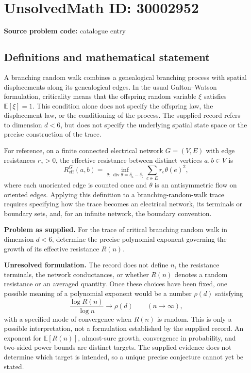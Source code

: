 \documentclass[11pt]{article}
\newcommand{\E}{\mathbb{E}}
\begin{document}
\section*{UnsolvedMath ID: 30002952}
\textbf{Source problem code:} catalogue entry
\subsection{Definitions and mathematical statement}
A branching random walk combines a genealogical branching process with spatial displacements along its genealogical edges. In the usual Galton--Watson formulation, criticality means that the offspring random variable \(\xi\) satisfies \(\E[\xi]=1\). This condition alone does not specify the offspring law, the displacement law, or the conditioning of the process. The supplied record refers to dimension \(d<6\), but does not specify the underlying spatial state space or the precise construction of the trace.

For reference, on a finite connected electrical network \(G=(V,E)\) with edge resistances \(r_e>0\), the effective resistance between distinct vertices \(a,b\in V\) is
\[
R_{\mathrm{eff}}^G(a,b)=\inf_{\theta:\,\operatorname{div}\theta=\delta_a-\delta_b}\sum_{e\in E}r_e\theta(e)^2,
\]
where each unoriented edge is counted once and \(\theta\) is an antisymmetric flow on oriented edges. Applying this definition to a branching-random-walk trace requires specifying how the trace becomes an electrical network, its terminals or boundary sets, and, for an infinite network, the boundary convention.

\textbf{Problem as supplied.} For the trace of critical branching random walk in dimension \(d<6\), determine the precise polynomial exponent governing the growth of its effective resistance \(R(n)\).

\textbf{Unresolved formulation.} The record does not define \(n\), the resistance terminals, the network conductances, or whether \(R(n)\) denotes a random resistance or an averaged quantity. Once these choices have been fixed, one possible meaning of a polynomial exponent would be a number \(\rho(d)\) satisfying
\[
\frac{\log R(n)}{\log n}\longrightarrow\rho(d)\qquad(n\to\infty),
\]
with a specified mode of convergence when \(R(n)\) is random. This is only a possible interpretation, not a formulation established by the supplied record. An exponent for \(\E[R(n)]\), almost-sure growth, convergence in probability, and two-sided power bounds are distinct targets. The supplied evidence does not determine which target is intended, so a unique precise conjecture cannot yet be stated.
\end{document}
